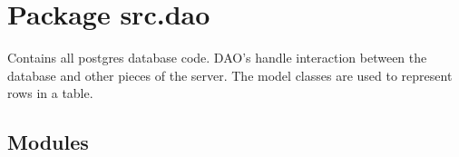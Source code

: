 %
%
%


\section{Package src.dao}

    \label{src:dao}
Contains all postgres database code. DAO's handle interaction between the 
database and other pieces of the server. The model classes are used to 
represent rows in a table.



\subsection{Modules}

